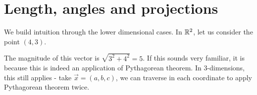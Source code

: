\section{Length, angles and projections}
We build intuition through the lower dimensional cases.
In $\mathbb{R}^2$, let us consider the point $(4,3)$.\\
\begin{figure}
\end{figure}

The magnitude of this vector is $\sqrt{3^2+4^2}=5$. If this sounds very familiar, it is because this is indeed an application of Pythagorean theorem. In 3-dimensions, this still applies - take $\vec{x}=(a,b,c)$, we can traverse in each coordinate to apply Pythagorean theorem twice.

\usetikzlibrary {3d}

